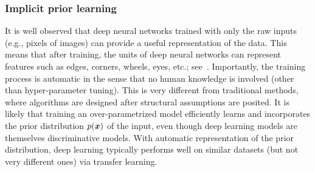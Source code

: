\subsubsection{Implicit prior learning}
It is well observed that deep neural networks trained with only the raw inputs (e.g., pixels of images) can provide a useful representation of the data. This means that after training, the units of deep neural networks can represent features such as edges, corners, wheels, eyes, etc.; see~\cite{yosinski2015understanding}. Importantly, the training process is automatic in the sense that no human knowledge is involved (other than hyper-parameter tuning). This is very different from traditional methods, where algorithms are designed after structural assumptions are posited. %
It is likely that training an over-parametrized model efficiently learns and incorporates the prior distribution $p(\text{\boldmath $x$})$ of the input, even though deep learning models are themselves discriminative models. With automatic representation of the prior distribution, deep learning typically performs well on similar datasets (but not very different ones) via transfer learning.





